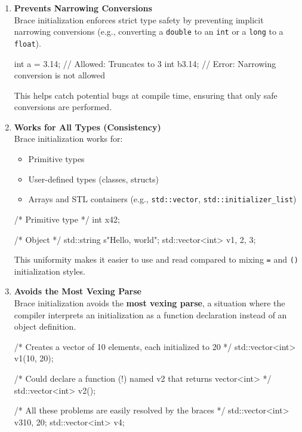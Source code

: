 \documentclass[../main]{subfiles}
\begin{document}
\begin{enumerate}
\item \textbf{Prevents Narrowing Conversions} \\
Brace initialization enforces strict type safety by preventing implicit narrowing conversions (e.g., converting a \texttt{double} to an \texttt{int} or a \texttt{long} to a \texttt{float}).

\begin{Code}
    int a = 3.14;       // Allowed: Truncates to 3
    int b{3.14};        // Error: Narrowing conversion is not allowed
\end{Code}

This helps catch potential bugs at compile time, ensuring that only safe conversions are performed.

\item \textbf{Works for All Types (Consistency)} \\
Brace initialization works for:
\begin{itemize}
    \item Primitive types
    \item User-defined types (classes, structs)
    \item Arrays and STL containers (e.g., \texttt{std::vector}, \texttt{std::initializer\_list})
\end{itemize}

\begin{Code}
    /* Primitive type */
    int x{42};

    /* Object */
    std::string s{"Hello, world"};
    std::vector<int> v{1, 2, 3};
\end{Code}

This uniformity makes it easier to use and read compared to mixing \texttt{=} and \texttt{()} initialization styles.

\item \textbf{Avoids the Most Vexing Parse} \\
Brace initialization avoids the \textbf{most vexing parse}, a situation where the compiler interprets an initialization as a function declaration instead of an object definition.

\begin{Code}
    /* Creates a vector of 10 elements, each initialized to 20 */
    std::vector<int> v1(10, 20);

    /* Could declare a function (!) named v2 that returns vector<int> */
    std::vector<int> v2();
    
    /* All these problems are easily resolved by the braces */
    std::vector<int> v3{10, 20}; 
    std::vector<int> v4{};
\end{Code}


\end{enumerate}
\end{document}
